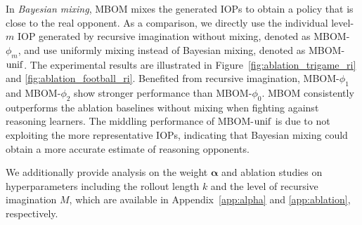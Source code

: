 \documentclass{article}
\begin{document}
In \textit{Bayesian mixing}, MBOM mixes the generated IOPs to obtain a policy that is close to the real opponent. As a comparison, we directly use the individual level-$m$ IOP generated by recursive imagination without mixing, denoted as MBOM-$\phi_m$, and use uniformly mixing instead of Bayesian mixing, denoted as MBOM-$\rm unif$. The experimental results are illustrated in Figure~\ref{fig:ablation_trigame_ri} and \ref{fig:ablation_football_ri}. Benefited from recursive imagination, MBOM-$\phi_1$ and MBOM-$\phi_2$ show stronger performance than MBOM-$\phi_0$. MBOM consistently outperforms the ablation baselines without mixing when fighting against reasoning learners. The middling performance of MBOM-$\rm unif$ is due to not exploiting the more representative IOPs, indicating that Bayesian mixing could obtain a more accurate estimate of reasoning opponents.

We additionally provide analysis on the weight $\bm{\alpha}$ and ablation studies on hyperparameters including the rollout length $k$ and the level of recursive imagination $M$, which are available in Appendix~\ref{app:alpha} and \ref{app:ablation}, respectively.
\end{document}
